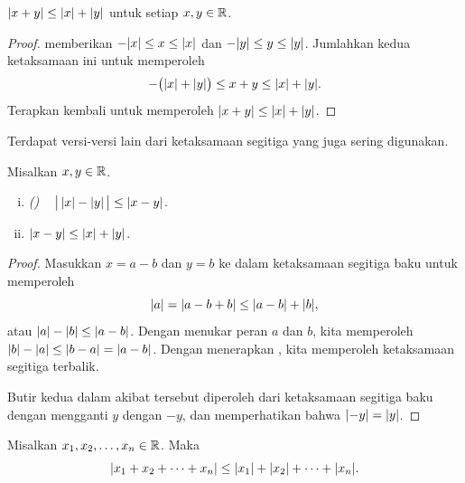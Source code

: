 \begin{prop}
$\lvert {x+y} \rvert \leq \lvert {x} \rvert+\lvert {y} \rvert$
untuk setiap $x, y \in {\mathbb{R}}$.
\end{prop}

\begin{proof}
 memberikan
$- \lvert {x} \rvert \leq x \leq \lvert {x} \rvert$ dan
$- \lvert {y} \rvert \leq y \leq \lvert {y} \rvert$.  Jumlahkan kedua ketaksamaan ini untuk memperoleh
\begin{equation*}
- \bigl(\lvert {x} \rvert+\lvert {y} \rvert\bigr) \leq x+y \leq \lvert {x} \rvert+ \lvert {y} \rvert .
\end{equation*}
Terapkan kembali  untuk memperoleh
$\lvert {x+y} \rvert \leq \lvert {x} \rvert+\lvert {y} \rvert$.
\end{proof}

Terdapat versi-versi lain dari ketaksamaan segitiga yang juga sering digunakan.

\begin{cor}
Misalkan $x,y \in {\mathbb{R}}$.
\begin{enumerate}[(i)]
\item \emph{()}
~
$\bigl\lvert { \, \lvert {x} \rvert-\lvert {y} \rvert \, } \bigr\rvert \leq \lvert {x-y} \rvert$.
\item $\lvert {x-y} \rvert \leq \lvert {x} \rvert+\lvert {y} \rvert$.
\end{enumerate}
\end{cor}

\begin{proof}
Masukkan $x=a-b$ dan $y=b$ ke dalam
ketaksamaan segitiga baku untuk memperoleh
\begin{equation*}
\lvert {a} \rvert = \lvert {a-b+b} \rvert \leq \lvert {a-b} \rvert + \lvert {b} \rvert ,
\end{equation*}
atau $\lvert {a} \rvert-\lvert {b} \rvert \leq \lvert {a-b} \rvert$.  Dengan menukar peran $a$ dan $b$,
kita memperoleh
$\lvert {b} \rvert-\lvert {a} \rvert \leq \lvert {b-a} \rvert = \lvert {a-b} \rvert$.  Dengan menerapkan
, kita memperoleh ketaksamaan segitiga
terbalik.

Butir kedua dalam akibat tersebut diperoleh dari
ketaksamaan segitiga baku dengan mengganti $y$ dengan $-y$, dan memperhatikan bahwa $\lvert {-y} \rvert =
\lvert {y} \rvert$.
\end{proof}

\begin{cor}
Misalkan $x_1, x_2, \ldots, x_n \in {\mathbb{R}}$.  Maka
\begin{equation*}
\lvert {x_1 + x_2 + \cdots + x_n} \rvert \leq
\lvert {x_1} \rvert + \lvert {x_2} \rvert + \cdots + \lvert {x_n} \rvert .
\end{equation*}
\end{cor}

